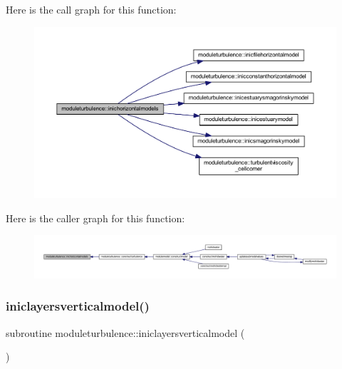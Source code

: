 Here is the call graph for this function\+:\nopagebreak
\begin{figure}[H]
\begin{center}
\leavevmode
\includegraphics[width=350pt]{namespacemoduleturbulence_a7d9753f3c1a5db2dfb55d80111926a99_cgraph}
\end{center}
\end{figure}
Here is the caller graph for this function\+:\nopagebreak
\begin{figure}[H]
\begin{center}
\leavevmode
\includegraphics[width=350pt]{namespacemoduleturbulence_a7d9753f3c1a5db2dfb55d80111926a99_icgraph}
\end{center}
\end{figure}
\mbox{\label{namespacemoduleturbulence_af52d9bce4123a146f0b750fab46833ee}} 
\subsubsection{\texorpdfstring{iniclayersverticalmodel()}{iniclayersverticalmodel()}}
{\footnotesize\ttfamily subroutine moduleturbulence\+::iniclayersverticalmodel (\begin{DoxyParamCaption}{ }\end{DoxyParamCaption})\hspace{0.3cm}{\ttfamily [private]}}

